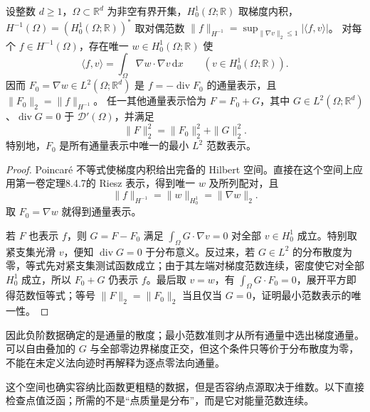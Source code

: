 \begin{proposition}[负阶数据的通量表示]
\label{b2:prop:15-negative-representation}
设整数 \(d\geq1\)，\(\Omega\subset\mathbb R^d\) 为非空有界开集，\(H_0^1(\Omega;\mathbb R)\) 取梯度内积，\(H^{-1}(\Omega)=(H_0^1(\Omega;\mathbb R))^*\) 取对偶范数
\(\|f\|_{H^{-1}}=\sup_{\|\nabla v\|_2\leq1}|\langle f,v\rangle|\)。
对每个 \(f\in H^{-1}(\Omega)\)，存在唯一 \(w\in H_0^1(\Omega;\mathbb R)\) 使
\[
 \langle f,v\rangle=\int_\Omega\nabla w\cdot\nabla v\,\mathrm dx
 \qquad(v\in H_0^1(\Omega;\mathbb R)).
\]
因而 \(F_0=\nabla w\in L^2(\Omega;\mathbb R^d)\) 是 \(f=-\operatorname{div}F_0\) 的通量表示，且
\(\|F_0\|_2=\|f\|_{H^{-1}}\)。
任一其他通量表示恰为 \(F=F_0+G\)，其中 \(G\in L^2(\Omega;\mathbb R^d)\)、\(\operatorname{div}G=0\) 于 \(\mathcal D'(\Omega)\)，并满足
\[
 \|F\|_2^2=\|F_0\|_2^2+\|G\|_2^2.
\]
特别地，\(F_0\) 是所有通量表示中唯一的最小 \(L^2\) 范数表示。
\end{proposition}
\begin{proof}
Poincaré 不等式使梯度内积给出完备的 Hilbert 空间。直接在这个空间上应用第一卷定理8.4.7的 Riesz 表示，得到唯一 \(w\) 及所列配对，且
\[
 \|f\|_{H^{-1}}=\|w\|_{H_0^1}=\|\nabla w\|_2.
\]
取 \(F_0=\nabla w\) 就得到通量表示。

若 \(F\) 也表示 \(f\)，则 \(G=F-F_0\) 满足
\(\int_\Omega G\cdot\nabla v=0\) 对全部 \(v\in H_0^1\) 成立。特别取紧支集光滑 \(v\)，便知 \(\operatorname{div}G=0\) 于分布意义。反过来，若 \(G\in L^2\) 的分布散度为零，等式先对紧支集测试函数成立；由于其左端对梯度范数连续，密度使它对全部 \(H_0^1\) 成立，所以 \(F_0+G\) 仍表示 \(f\)。最后取 \(v=w\)，有 \(\int_\Omega G\cdot F_0=0\)，展开平方即得范数恒等式；等号 \(\|F\|_2=\|F_0\|_2\) 当且仅当 \(G=0\)，证明最小范数表示的唯一性。
\end{proof}

因此负阶数据确定的是通量的散度；最小范数准则才从所有通量中选出梯度通量。可以自由叠加的 \(G\) 与全部零边界梯度正交，但这个条件只等价于分布散度为零，不能在未定义法向迹时再解释为逐点零法向通量。

这个空间也确实容纳比函数更粗糙的数据，但是否容纳点源取决于维数。以下直接检查点值泛函；所需的不是“点质量是分布”，而是它对能量范数连续。

